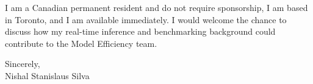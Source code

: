 \documentclass[11pt]{article}
\begin{document}
\vspace{0.5em}
\noindent I am a Canadian permanent resident and do not require sponsorship, I am based in Toronto, and I am available immediately. I would welcome the chance to discuss how my real-time inference and benchmarking background could contribute to the Model Efficiency team.

\vspace{1em}
\noindent Sincerely, \\
Nishal Stanislaus Silva
\end{document}
